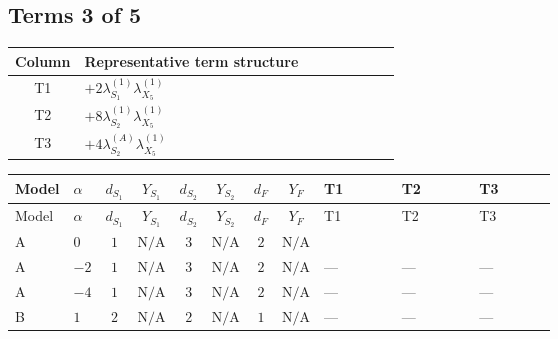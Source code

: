 \documentclass[8pt]{article}
\begin{document}
\begin{landscape}
\subsection*{Terms 3 of 5}
\begin{center}
\begin{tabular}{@{}c >{\raggedright\arraybackslash}p{0.82\linewidth}@{}}
\toprule
Column & Representative term structure \\
\midrule
T1 & \(\displaystyle +2 {\lambda_{S_1}^{(1)}} {\lambda_{X_{5}}^{(1)}}\) \\
\midrule
T2 & \(\displaystyle +8 {\lambda_{S_2}^{(1)}} {\lambda_{X_{5}}^{(1)}}\) \\
\midrule
T3 & \(\displaystyle +4 {\lambda_{S_2}^{(A)}} {\lambda_{X_{5}}^{(1)}}\) \\
\midrule
\bottomrule
\end{tabular}
\end{center}
\smallskip
\tiny
\begin{longtable}{@{}llcccccc >{\raggedright\arraybackslash}p{0.21\linewidth} >{\raggedright\arraybackslash}p{0.21\linewidth} >{\raggedright\arraybackslash}p{0.21\linewidth}@{}}
\toprule
Model & $\alpha$ & $d_{S_1}$ & $Y_{S_1}$ & $d_{S_2}$ & $Y_{S_2}$ & $d_F$ & $Y_F$ & T1 & T2 & T3 \\
\midrule
\endfirsthead
\toprule
Model & $\alpha$ & $d_{S_1}$ & $Y_{S_1}$ & $d_{S_2}$ & $Y_{S_2}$ & $d_F$ & $Y_F$ & T1 & T2 & T3 \\
\midrule
\endhead
A & $0$ & $1$ & $\text{N/A}$ & $3$ & $\text{N/A}$ & $2$ & $\text{N/A}$ & \scriptsize\adjustbox{max width=\linewidth}{$\begin{gathered} +2 {\lambda_{S_1}^{(1)}} {\lambda_{X_{5}}^{(1)}}\end{gathered}$} & \scriptsize\adjustbox{max width=\linewidth}{$\begin{gathered} +8 {\lambda_{S_2}^{(1)}} {\lambda_{X_{5}}^{(1)}}\end{gathered}$} & \scriptsize\adjustbox{max width=\linewidth}{$\begin{gathered} +4 {\lambda_{S_2}^{(A)}} {\lambda_{X_{5}}^{(1)}}\end{gathered}$} \\
\midrule
A & $-2$ & $1$ & $\text{N/A}$ & $3$ & $\text{N/A}$ & $2$ & $\text{N/A}$ & --- & --- & --- \\
\midrule
A & $-4$ & $1$ & $\text{N/A}$ & $3$ & $\text{N/A}$ & $2$ & $\text{N/A}$ & --- & --- & --- \\
\midrule
B & $1$ & $2$ & $\text{N/A}$ & $2$ & $\text{N/A}$ & $1$ & $\text{N/A}$ & --- & --- & --- \\

\end{longtable}
\end{landscape}
\end{document}
